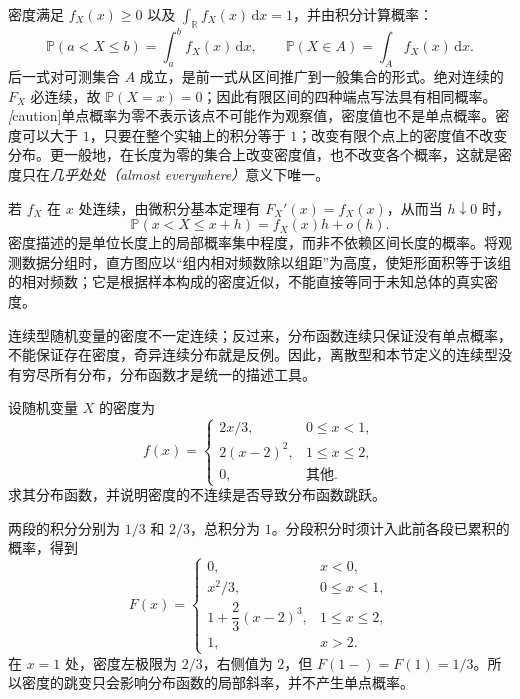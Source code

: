 密度满足 $f_X(x)\ge0$ 以及 $\int_{\mathbb R}f_X(x)\,\mathrm dx=1$，并由积分计算概率：
\begin{equation}
  \mathbb P(a<X\le b)=\int_a^bf_X(x)\,\mathrm dx,
  \qquad
  \mathbb P(X\in A)=\int_Af_X(x)\,\mathrm dx.
  \label{eq:study-density-probability}
\end{equation}
后一式对可测集合 $A$ 成立，是前一式从区间推广到一般集合的形式。绝对连续的 $F_X$ 必连续，故 $\mathbb P(X=x)=0$；因此有限区间的四种端点写法具有相同概率。\emph[caution]{单点概率为零不表示该点不可能作为观察值，密度值也不是单点概率。}密度可以大于 $1$，只要在整个实轴上的积分等于 $1$；改变有限个点上的密度值不改变分布。更一般地，在长度为零的集合上改变密度值，也不改变各个概率，这就是密度只在\emph{几乎处处（almost everywhere）}意义下唯一。

若 $f_X$ 在 $x$ 处连续，由微积分基本定理有 $F_X'(x)=f_X(x)$，从而当 $h\downarrow0$ 时，
\begin{equation}
  \mathbb P(x<X\le x+h)=f_X(x)h+o(h).
  \label{eq:study-density-local}
\end{equation}
密度描述的是单位长度上的局部概率集中程度，而非不依赖区间长度的概率。将观测数据分组时，直方图应以“组内相对频数除以组距”为高度，使矩形面积等于该组的相对频数；它是根据样本构成的密度近似，不能直接等同于未知总体的真实密度。

连续型随机变量的密度不一定连续；反过来，分布函数连续只保证没有单点概率，不能保证存在密度，奇异连续分布就是反例。因此，离散型和本节定义的连续型没有穷尽所有分布，分布函数才是统一的描述工具。

\begin{example}
\label{ex:study-piecewise-density}
设随机变量 $X$ 的密度为
\[
  f(x)=\begin{cases}
    2x/3,&0\le x<1,\\
    2(x-2)^2,&1\le x\le2,\\
    0,&\text{其他}.
  \end{cases}
\]
求其分布函数，并说明密度的不连续是否导致分布函数跳跃。
\end{example}

\begin{solve}
两段的积分分别为 $1/3$ 和 $2/3$，总积分为 $1$。分段积分时须计入此前各段已累积的概率，得到
\[
  F(x)=\begin{cases}
    0,&x<0,\\
    x^2/3,&0\le x<1,\\
    1+\dfrac23(x-2)^3,&1\le x\le2,\\
    1,&x>2.
  \end{cases}
\]
在 $x=1$ 处，密度左极限为 $2/3$，右侧值为 $2$，但 $F(1-)=F(1)=1/3$。所以密度的跳变只会影响分布函数的局部斜率，并不产生单点概率。
\end{solve}

